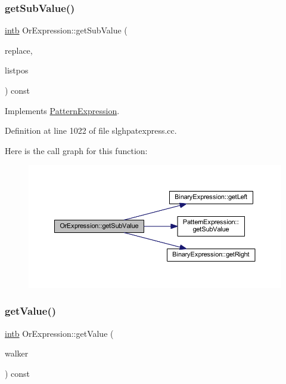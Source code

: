 \subsubsection{\texorpdfstring{getSubValue()}{getSubValue()}}
{\footnotesize\ttfamily \mbox{\hyperlink{types_8h_aa925ba3e627c2df89d5b1cfe84fb8572}{intb}} Or\+Expression\+::get\+Sub\+Value (\begin{DoxyParamCaption}\item[{const vector$<$ \mbox{\hyperlink{types_8h_aa925ba3e627c2df89d5b1cfe84fb8572}{intb}} $>$ \&}]{replace,  }\item[{int4 \&}]{listpos }\end{DoxyParamCaption}) const\hspace{0.3cm}{\ttfamily [virtual]}}



Implements \mbox{\hyperlink{class_pattern_expression_ade37db4aa76dd442b189bf4a6bb2d9dd}{Pattern\+Expression}}.



Definition at line 1022 of file slghpatexpress.\+cc.

Here is the call graph for this function\+:
\nopagebreak
\begin{figure}[H]
\begin{center}
\leavevmode
\includegraphics[width=350pt]{class_or_expression_af7c1fe52ac78b97d8bf36d4fa94877fd_cgraph}
\end{center}
\end{figure}
\mbox{\label{class_or_expression_a48042c08d38b45e3f32e28953a25584b}} 
\subsubsection{\texorpdfstring{getValue()}{getValue()}}
{\footnotesize\ttfamily \mbox{\hyperlink{types_8h_aa925ba3e627c2df89d5b1cfe84fb8572}{intb}} Or\+Expression\+::get\+Value (\begin{DoxyParamCaption}\item[{\mbox{\hyperlink{class_parser_walker}{Parser\+Walker}} \&}]{walker }\end{DoxyParamCaption}) const\hspace{0.3cm}{\ttfamily [virtual]}}



